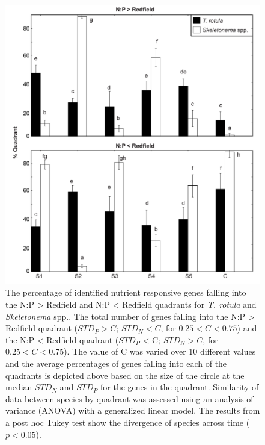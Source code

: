 
\begin{figure}[h!]
  \centering
    \includegraphics[width=1\textwidth]{Images/C3_SFigure10_BarGraph_Quadrant_2575_stats.pdf}
    \caption[The percentage of identified nutrient responsive genes falling into the N:P > Redfield and N:P < Redfield quadrants with varried cutoffs]{The percentage of identified nutrient responsive genes falling into the N:P > Redfield and N:P < Redfield quadrants for \textit{T. rotula} and \textit{Skeletonema} spp.. The total number of genes falling into the N:P > Redfield quadrant ($STD_P > C$; $STD_N < C$, for $0.25 < C < 0.75$) and the N:P < Redfield quadrant ($STD_P$ < C; $STD_N > C$, for $0.25 < C < 0.75$). The value of C was varied over 10 different values and the average percentages of genes falling into each of the quadrants is depicted above based on the size of the circle at the median $STD_N$ and $STD_P$ for the genes in the quadrant. Similarity of data between species by quadrant was assessed using an analysis of variance (ANOVA) with a generalized linear model. The results from a post hoc Tukey test show the divergence of species across time ($p < 0.05$).}
  \label{fig:a3f10}
\end{figure}

